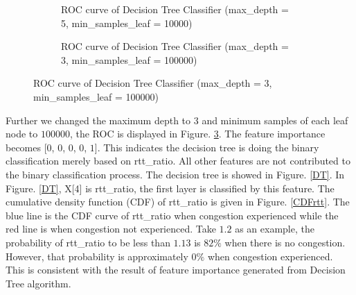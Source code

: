 \begin{figure}[!htb]\centering
   \begin{subfigure}{0.49\textwidth}
\caption{ROC curve of Decision Tree Classifier (max\_depth = 5, min\_samples\_leaf = 10000)}
\label{DecisionTreeRoc}

   \end{subfigure}
   \begin {subfigure}{0.49\textwidth}
\caption{ROC curve of Decision Tree Classifier (max\_depth = 3, min\_samples\_leaf = 100000)}
\label{DTRoc}
   \end{subfigure}
\end{figure}
Further we changed the maximum depth to $3$ and minimum samples of each leaf node to $100000$, the ROC is displayed in Figure. \ref{DTRoc}. The feature importance becomes [$0$, $0$, $0$, $0$, $1$]. This indicates the decision tree is doing the binary classification merely based on rtt\_ratio. All other features are not contributed to the binary classification process. 
The decision tree is showed in Figure. \ref{DT}. In Figure. \ref{DT}, X[4] is rtt\_ratio, the first layer is classified by this feature. The cumulative density function (CDF) of rtt\_ratio is given in Figure. \ref{CDFrtt}. The blue line is the CDF curve of rtt\_ratio when congestion experienced while the red line is when congestion not experienced. Take $1.2$ as an example, the probability of rtt\_ratio to be less than $1.13$ is $82\%$ when there is no congestion. However, that probability is approximately $0\%$ when congestion experienced. This is consistent with the result of feature importance generated from Decision Tree algorithm. 

